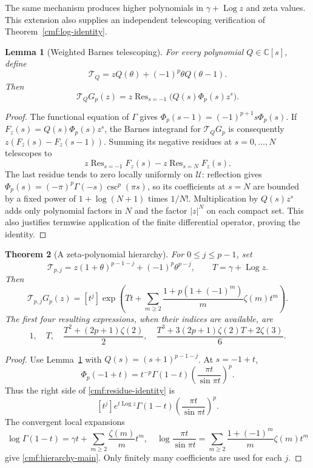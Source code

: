 \documentclass[11pt,a4paper]{article}
\numberwithin{equation}{section}
\newtheorem{theorem}{Theorem}[section]
\newtheorem{lemma}[theorem]{Lemma}
\theoremstyle{definition}
\theoremstyle{remark}
\DeclareMathOperator{\Log}{Log}
\begin{document}
The same mechanism produces higher polynomials in $\gamma+\Log z$
and zeta values. This extension also supplies an independent
telescoping verification of Theorem~\ref{cmf:log-identity}.

\begin{lemma}[Weighted Barnes telescoping]
\label{cmf:telescoping}
For every polynomial $Q\in\mathbb C[s]$, define
\[
 \mathcal T_Q=zQ(\theta)+(-1)^p\theta Q(\theta-1).
\]
Then
\begin{equation}\label{cmf:residue-identity}
 \mathcal T_QG_p(z)
 =z\operatorname{Res}_{s=-1}\bigl(Q(s)\Phi_p(s)z^s\bigr).
\end{equation}
\end{lemma}
\begin{proof}
The functional equation of $\Gamma$ gives
$\Phi_p(s-1)=(-1)^{p+1}s\Phi_p(s)$. If
$F_z(s)=Q(s)\Phi_p(s)z^s$, the Barnes integrand for
$\mathcal T_QG_p$ is consequently $z(F_z(s)-F_z(s-1))$.
Summing its negative residues at $s=0,\ldots,N$ telescopes to
\[
 z\operatorname{Res}_{s=-1}F_z(s)
 -z\operatorname{Res}_{s=N}F_z(s).
\]
The last residue tends to zero locally uniformly on $\mathscr U$:
reflection gives
$\Phi_p(s)=(-\pi)^p\Gamma(-s)\csc^p(\pi s)$, so its
coefficients at $s=N$ are bounded by a fixed power of
$1+\log(N+1)$ times $1/N!$. Multiplication by $Q(s)z^s$
adds only polynomial factors in $N$ and the factor $|z|^N$ on
each compact set. This also justifies termwise application of
the finite differential operator, proving the identity.
\end{proof}

\begin{theorem}[A zeta-polynomial hierarchy]
\label{cmf:hierarchy}
For $0\le j\le p-1$, set
\[
 \mathcal T_{p,j}=z(1+\theta)^{p-1-j}+(-1)^p\theta^{p-j},
 \qquad T=\gamma+\Log z.
\]
Then
\begin{equation}\label{cmf:hierarchy-main}
 \mathcal T_{p,j}G_p(z)
 =[t^j]\exp\!\left(
 Tt+\sum_{m\ge2}\frac{1+p(1+(-1)^m)}{m}\zeta(m)t^m
 \right).
\end{equation}
The first four resulting expressions, when their indices are
available, are
\[
 1,\quad T,\quad
 \frac{T^2+(2p+1)\zeta(2)}2,\quad
 \frac{T^3+3(2p+1)\zeta(2)T+2\zeta(3)}6.
\]
\end{theorem}
\begin{proof}
Use Lemma~\ref{cmf:telescoping} with
$Q(s)=(s+1)^{p-1-j}$. At $s=-1+t$,
\[
 \Phi_p(-1+t)=t^{-p}\Gamma(1-t)
                 \left(\frac{\pi t}{\sin\pi t}\right)^p.
\]
Thus the right side of \eqref{cmf:residue-identity} is
\[
 [t^j]e^{t\Log z}\Gamma(1-t)
                 \left(\frac{\pi t}{\sin\pi t}\right)^p.
\]
The convergent local expansions
\[
 \log\Gamma(1-t)=\gamma t+\sum_{m\ge2}\frac{\zeta(m)}m t^m,
 \quad
 \log\frac{\pi t}{\sin\pi t}
   =\sum_{m\ge2}\frac{1+(-1)^m}{m}\zeta(m)t^m
\]
give \eqref{cmf:hierarchy-main}. Only finitely many coefficients
are used for each $j$.
\end{proof}
\end{document}
